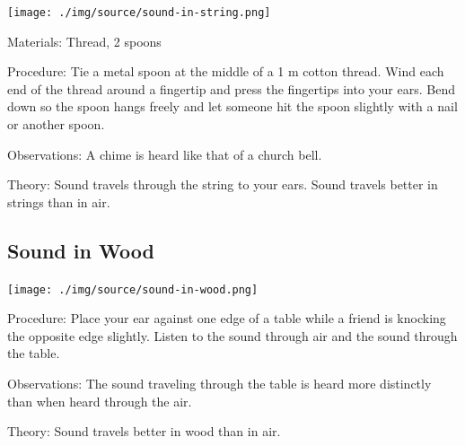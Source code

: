 \begin{multicols}{2}
\begin{center}
\texttt{[image: ./img/source/sound-in-string.png]}
\end{center}

\begin{description*}
\item[Materials:]{Thread, 2 spoons}
\item[Procedure:]{Tie a metal spoon at the middle of a 1 m cotton thread. Wind each end of the thread around a fingertip and press the fingertips into your ears. Bend down so the spoon hangs freely and let someone hit the spoon slightly with a nail or another spoon.}
\item[Observations:]{A chime is heard like that of a church bell.}
\item[Theory:]{Sound travels through the string to your ears. Sound travels better in strings than in air.}
\end{description*}

\subsection{Sound in Wood}

\begin{center}
\texttt{[image: ./img/source/sound-in-wood.png]}
\end{center}

\begin{description*}
\item[Procedure:]{Place your ear against one edge of a table while a friend is knocking the opposite edge slightly. Listen to the sound through air and the sound through the table.}
\item[Observations:]{The sound traveling through the table is heard more distinctly than when heard through the air.}
\item[Theory:]{Sound travels better in wood than in air.}
\end{description*}


\end{multicols}
